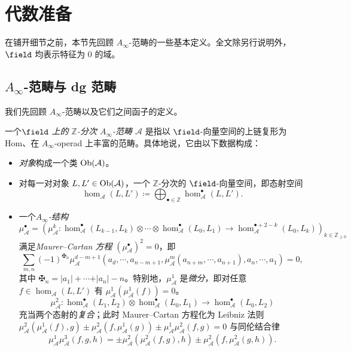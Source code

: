 \section{代数准备\label{sec:algebraic-preparations}}
在铺开细节之前，本节先回顾 $A_{\infty}$-范畴的一些基本定义。全文除另行说明外，$\field$ 均表示特征为 $0$ 的域。
\subsection{$A_{\infty}$-范畴与 dg 范畴}
我们先回顾 $A_{\infty}$-范畴以及它们之间函子的定义。
\begin{dfn}
一个\emph{$\field$ 上的 $\mathbb{Z}$-分次 $A_{\infty}$-范畴 $\mathcal{A}$} 是指以 $\field$-向量空间的上链复形为 Hom、在 $A_{\infty}$-operad 上丰富的范畴。具体地说，它由以下数据构成：
\begin{itemize}
\item
\emph{对象}构成一个类 $\operatorname{Ob}(\mathcal{A})$。
\item 对每一对对象 $L,L'\in\operatorname{Ob} (\mathcal{A})$，一个 $\mathbb{Z}$-分次的 $\field$-向量空间，即态射空间
$$
\hom_{\mathcal{A}}(L,L')\coloneqq \bigoplus_{\bullet\in\mathbb{Z}} \hom_{\mathcal{A}}^{\bullet}(L,L').
$$
\item 一个\emph{$A_{\infty}$-结构} \[
    \mu_{\mathcal{A}}^{\bullet} =\left(\mu_{\mathcal{A}}^k\colon\hom_{\mathcal{A}}^{\bullet} (L_{k-1},L_k)\otimes\dotsb\otimes\hom_{\mathcal{A}}^{\bullet} (L_0, L_1)\to\hom_{\mathcal{A}}^{\bullet +2-k} (L_0, L_k)\right)_{k\in\mathbb{Z}_{\geq 0}}
\] 满足\emph{Maurer--Cartan 方程} $(\mu_{\mathcal{A}}^{\bullet})^2=0$，即 \[
    \sum_{m,n}(-1)^{\maltese_n}\mu_{\mathcal{A}}^{d-m+1} (a_d,\dotsb, a_{n-m+1},\mu_{\mathcal{A}}^m (a_{n+m},\dotsb, a_{n+1}),a_n,\dotsb, a_1)=0,
\] 其中 $\maltese_n =\vert a_1\vert+\dotsb+\vert a_n\vert -n$。特别地，$\mu_{\mathcal{A}}^1$ 是\emph{微分}，即对任意 $f\in\hom_{\mathcal{A}}(L,L')$ 有 $\mu_{\mathcal{A}}^1(\mu_{\mathcal{A}}^1(f))=0$。\[
\mu_{\mathcal{A}}^2\colon\hom_{\mathcal{A}}^{\bullet} (L_1,L_2)\otimes\hom_{\mathcal{A}}^{\bullet} (L_0,L_1)\to\hom_{\mathcal{A}}^{\bullet} (L_0, L_2)
\] 充当两个态射的\emph{复合}；此时 Maurer--Cartan 方程化为 Leibniz 法则 $\mu_{\mathcal{A}}^2 (\mu_{\mathcal{A}}^1 (f),g)\pm\mu_{\mathcal{A}}^2 (f,\mu_{\mathcal{A}}^1 (g))\pm\mu_{\mathcal{A}}^1\mu_{\mathcal{A}}^2 (f,g)=0$ 与同伦结合律 \begin{equation}\label{eq:homotopy-associativity}
\mu^1_{\mathcal{A}}\mu_{\mathcal{A}}^3 (f,g,h)=\pm\mu_{\mathcal{A}}^2 (\mu_{\mathcal{A}}^2 (f,g),h)\pm\mu_{\mathcal{A}}^2 (f,\mu_{\mathcal{A}}^2 (g,h)).

\end{equation}
\end{itemize}
\end{dfn}
